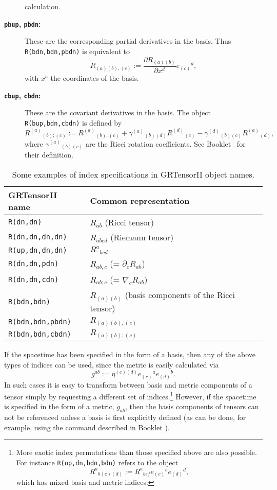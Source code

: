 \documentclass{article}
\begin{document}
\begin{description}
{    calculation.}
  \item[\textbf{\texttt{pbup}, \texttt{pbdn}:}] These are the corresponding
    partial derivatives in the basis. Thus \texttt{R(bdn,bdn,pbdn)} is
    equivalent to
    \[
      R_{(a)(b),(c)} := \frac{\partial R_{(a)(b)}}{\partial x^d}
        e_{(c)}{}^d,
    \]
    with $x^a$ the coordinates of the basis.
  \item[\textbf{\texttt{cbup}, \texttt{cbdn}:}] These are the covariant
    derivatives in the basis. The object \texttt{R(bup,bdn,cbdn)} is defined
    by
    \[
      R^{(a)}{}_{(b);(c)} := R^{(a)}{}_{(b),(c)} + \gamma^{(a)}{}_{(b)(d)}
      R^{(d)}{}_{(c)} - \gamma^{(d)}{}_{(b)(c)} R^{(a)}{}_{(d)},
    \]
    where $\gamma^{(a)}{}_{(b)(c)}$ are the Ricci rotation coefficients.
    See Booklet \grBasisRef~for their definition.
\end{description}
\begin{table}
  \begin{center}
    \begin{tabular}{ll}\hline\hline
      \textbf{GRTensorII name} & \textbf{Common representation}\\ \hline
      \texttt{R(dn,dn)}        & $R_{ab}$ (Ricci tensor) \\
      \texttt{R(dn,dn,dn,dn)}  & $R_{abcd}$ (Riemann tensor) \\
      \texttt{R(up,dn,dn,dn)}  & $R^a{}_{bcd}$  \\
      \texttt{R(dn,dn,pdn)}    & $R_{ab,c}$ (= $\partial_c R_{ab}$)\\
      \texttt{R(dn,dn,cdn)}    & $R_{ab;c}$ (= $\nabla_c R_{ab}$)\\
      \texttt{R(bdn,bdn)}      & $R_{(a)(b)}$ (basis components of the Ricci
       tensor) \\
      \texttt{R(bdn,bdn,pbdn)} & $R_{(a)(b),(c)}$ \\
      \texttt{R(bdn,bdn,cbdn)} & $R_{(a)(b);(c)}$ \\ \hline\hline
    \end{tabular}
    \caption{Some examples of index specifications in GRTensorII object names.}
    \label{tbl:indices}
  \end{center}
\end{table}

If the spacetime has been specified in the form of a basis, then any of
the above types of indices can be used, since the metric is easily
calculated via
\[
  g^{ab} := \eta^{(c)(d)} e_{(c)}{}^a e_{(d)}{}^b.
\]
In such cases it is easy to transform between basis and metric
components of a tensor simply by requesting a different set of
indices.\footnote{More exotic index permutations than those specified
above are also possible. For instance \texttt{R(up,dn,bdn,bdn)} refers
to the object
\[
  R^a{}_{b(c)(d)} := R^a{}_{bef} e_{(c)}{}^e e_{(d)}{}^d,
\]
which has mixed basis and metric indices.}
However, if the spacetime is specified in the form of a metric, $g_{ab}$,
then the basis components of tensors can not be referenced unless a
basis is first explicitly defined (as can be done, for example, using
the  command described in Booklet \grMakegRef).
\end{document}
